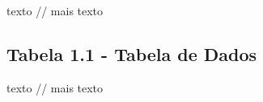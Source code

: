 \documentclass{article}%
\begin{document}
%
 texto // mais texto%
\subsection{Tabela 1.1 {-} Tabela de Dados}%
\label{subsec:Tabela1.1{-}TabeladeDados}%

%
 texto // mais texto%
\end{document}
